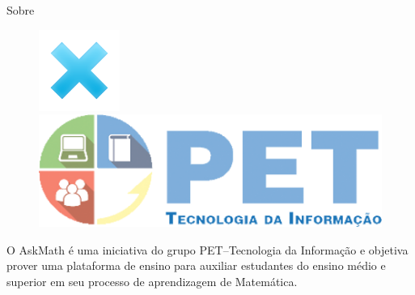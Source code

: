 \documentclass[10pt]{beamer}
\begin{document}
\begin{frame}{Sobre}
\begin{figure}[H]
\begin{minipage}[b]{0.1\textwidth}
    \includegraphics[width=\textwidth]{figuras/vs.png}
  \end{minipage}
  \hfill
  \begin{minipage}[b]{0.3\textwidth}
    \includegraphics[width=\textwidth]{figuras/petti.png}
  \end{minipage}
  \hfill
  \begin{minipage}[b]{0.25\textwidth}\end{minipage}
\end{figure}

O AskMath é uma iniciativa do grupo PET–Tecnologia da Informação e objetiva prover uma plataforma de ensino para auxiliar estudantes do 
ensino médio e superior em seu processo de aprendizagem de Matemática.

\end{frame}
\end{document}
